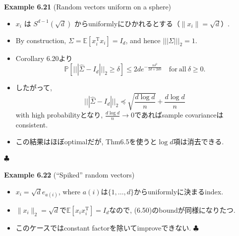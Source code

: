 \documentclass[unicode,aspectratio=169,11pt]{beamer}
\def\endexample{\hfill $\clubsuit$}
\newcommand{\ex}{\mathbb{E}}
\newcommand{\bb}{\mathbb}
\newcommand{\tr}{\mathrm{T}}
\begin{document}
\begin{frame}{}{}
  {\bf Example 6.21} (Random vectors uniform on a sphere)
  \begin{itemize}
    \item $x_i$ は $S^{d-1}(\sqrt{d})$ からuniformlyにひかれるとする（$\|x_i\| = \sqrt{d}$）.
    \item By construction, $\Sigma = \ex[x_i^\tr x_i] = I_d$, and hence $|||\Sigma|||_2 = 1$.
    \item Corollary 6.20より
          \[
            \bb{P}[|||\widehat{\Sigma} - I_d|||_2 \ge \delta]
            \le 2 d e^{-\frac{n\delta^2}{2d+2d\delta}}
            \quad \mathrm{for\ all} \ \delta \ge 0.
            \tag{6.50}
          \]
    \item したがって,
          \[
            ||| \widehat{\Sigma} - I_d |||_2
            \preceq \sqrt{\frac{d\log d}{n}} + \frac{d \log d}{n}
            \tag{6.51}
          \]
          with high probabilityとなり, $\frac{d\log d}{n} \to 0$であればsample covarianceはconsistent.
    \item この結果はほぼoptimalだが, Thm6.5を使うと$\log d$項は消去できる.
  \end{itemize}
  \endexample
\end{frame}

\begin{frame}{}{}
  {\bf Example 6.22} (``Spiked'' random vectors)
  \begin{itemize}
    \item $x_i = \sqrt{d} e_{a(i)}$, where $a(i)$は$\{1,\dots,d\}$からuniformlyに決まるindex.
    \item $\|x_i\|_2 = \sqrt{d}$で$\ex[x_ix_i^\tr] = I_d$なので, (6.50)のboundが同様になりたつ.
    \item このケースではconstant factorを除いてimproveできない.
    \endexample
  \end{itemize}
\end{frame}
\end{document}
